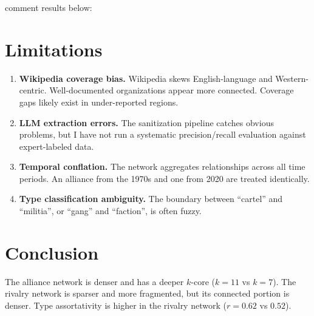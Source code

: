 \documentclass[11pt,a4paper]{article}
\begin{document}
comment results below:



\section{Limitations}\label{sec:limitations}

\begin{enumerate}[leftmargin=2em]
  \item \textbf{Wikipedia coverage bias.} Wikipedia skews English-language and Western-centric. Well-documented organizations appear more connected. Coverage gaps likely exist in under-reported regions.
  \item \textbf{LLM extraction errors.} The sanitization pipeline catches obvious problems, but I have not run a systematic precision/recall evaluation against expert-labeled data.
  \item \textbf{Temporal conflation.} The network aggregates relationships across all time periods. An alliance from the 1970s and one from 2020 are treated identically.
  \item \textbf{Type classification ambiguity.} The boundary between ``cartel'' and ``militia'', or ``gang'' and ``faction'', is often fuzzy.
\end{enumerate}

\section{Conclusion}\label{sec:conclusion}

The alliance network is denser and has a deeper $k$-core ($k=11$ vs $k=7$). The rivalry network is sparser and more fragmented, but its connected portion is denser. Type assortativity is higher in the rivalry network ($r = 0.62$ vs $0.52$).
\end{document}
